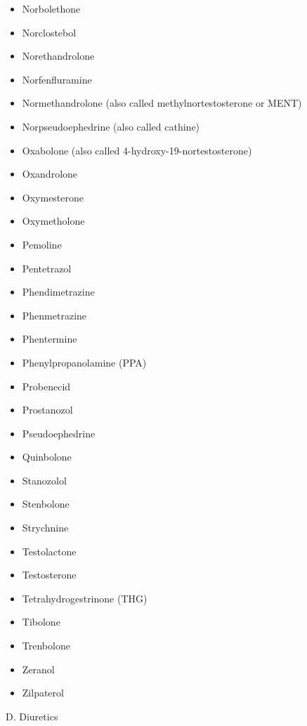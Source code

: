 \documentclass[
]{book}
\begin{document}
\begin{itemize}
\item
  Norbolethone
\item
  Norclostebol
\item
  Norethandrolone
\item
  Norfenfluramine
\item
  Normethandrolone (also called methylnortestosterone or MENT)
\item
  Norpseudoephedrine (also called cathine)
\item
  Oxabolone (also called 4-hydroxy-19-nortestosterone)
\item
  Oxandrolone
\item
  Oxymesterone
\item
  Oxymetholone
\item
  Pemoline
\item
  Pentetrazol
\item
  Phendimetrazine
\item
  Phenmetrazine
\item
  Phentermine
\item
  Phenylpropanolamine (PPA)
\item
  Probenecid
\item
  Prostanozol
\item
  Pseudoephedrine
\item
  Quinbolone
\item
  Stanozolol
\item
  Stenbolone
\item
  Strychnine
\item
  Testolactone
\item
  Testosterone
\item
  Tetrahydrogestrinone (THG)
\item
  Tibolone
\item
  Trenbolone
\item
  Zeranol
\item
  Zilpaterol
\end{itemize}

D. Diuretics
\end{document}
